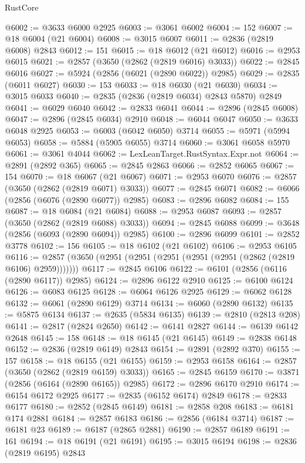 \begin{lexlean}{RustCore}
\begin{coremodule}
@6002 := @3633 @6000 @2925
@6003 := @3061 @6002
@6004 := 152
@6007 := @18 @6004 (@21 @6004)
@6008 := @3015 @6007
@6011 := @2836 (@2819 @6008) @2843
@6012 := 151
@6015 := @18 @6012 (@21 @6012)
@6016 := @2953 @6015
@6021 := @2857 (@3650 (@2862 (@2819 @6016) @3033))
@6022 := @2845 @6016
@6027 := @5924 (@2856 (@6021 (@2890 @6022)) @2985)
@6029 := @2835 (@6011 @6027)
@6030 := 153
@6033 := @18 @6030 (@21 @6030)
@6034 := @3015 @6033
@6040 := @2835 (@2836 (@2819 @6034) @2843 @5870) @2849
@6041 := @6029 @6040
@6042 := @2833 @6041
@6044 := @2896 (@2845 @6008)
@6047 := @2896 (@2845 @6034) @2910
@6048 := @6044 @6047
@6050 := @3633 @6048 @2925
@6053 := @6003 (@6042 @6050) @3714
@6055 := @5971 (@5994 @6053)
@6058 := @5884 (@5905 @6055) @3714
@6060 := @3061 @6058 @5970
@6061 := @3061 @4044
@6062 := LexLeanTarget.RustSyntax.Expr.not
@6064 := @2891 (@2892 @365)
@6065 := @2845 @2863
@6066 := @2852 @6065
@6067 := 154
@6070 := @18 @6067 (@21 @6067)
@6071 := @2953 @6070
@6076 := @2857 (@3650 (@2862 (@2819 @6071) @3033))
@6077 := @2845 @6071
@6082 := @6066 (@2856 (@6076 (@2890 @6077)) @2985)
@6083 := @2896 @6082
@6084 := 155
@6087 := @18 @6084 (@21 @6084)
@6088 := @2953 @6087
@6093 := @2857 (@3650 (@2862 (@2819 @6088) @3033))
@6094 := @2845 @6088
@6099 := @3648 (@2856 (@6093 (@2890 @6094)) @2985)
@6100 := @2896 @6099
@6101 := @2852 @3778
@6102 := 156
@6105 := @18 @6102 (@21 @6102)
@6106 := @2953 @6105
@6116 := @2857 (@3650 (@2951 (@2951 (@2951 (@2951 (@2951 (@2862 (@2819 @6106) @2959)))))))
@6117 := @2845 @6106
@6122 := @6101 (@2856 (@6116 (@2890 @6117)) @2985)
@6124 := @2896 @6122 @2910
@6125 := @6100 @6124
@6126 := @6083 @6125
@6128 := @6064 @6126 @2925
@6129 := @6062 @6128
@6132 := @6061 (@2890 @6129) @3714
@6134 := @6060 (@2890 @6132)
@6135 := @5875 @6134
@6137 := @2635 (@5834 @6135)
@6139 := @2810 (@2813 @208)
@6141 := @2817 (@2824 @2650)
@6142 := @6141 @2827
@6144 := @6139 @6142 @2648
@6145 := 158
@6148 := @18 @6145 (@21 @6145)
@6149 := @2838 @6148
@6152 := @2836 (@2819 @6149) @2843
@6154 := @2891 (@2892 @370)
@6155 := 157
@6158 := @18 @6155 (@21 @6155)
@6159 := @2953 @6158
@6164 := @2857 (@3650 (@2862 (@2819 @6159) @3033))
@6165 := @2845 @6159
@6170 := @3871 (@2856 (@6164 (@2890 @6165)) @2985)
@6172 := @2896 @6170 @2910
@6174 := @6154 @6172 @2925
@6177 := @2835 (@6152 @6174) @2849
@6178 := @2833 @6177
@6180 := @2852 (@2845 @6149)
@6181 := @2858 @208
@6183 := @6181 @174 @2881
@6184 := @2857 @6183
@6186 := @2856 (@6184 @3714)
@6187 := @6181 @23
@6189 := @6187 (@2865 @2881)
@6190 := @2857 @6189
@6191 := 161
@6194 := @18 @6191 (@21 @6191)
@6195 := @3015 @6194
@6198 := @2836 (@2819 @6195) @2843

\end{coremodule}
\end{lexlean}

